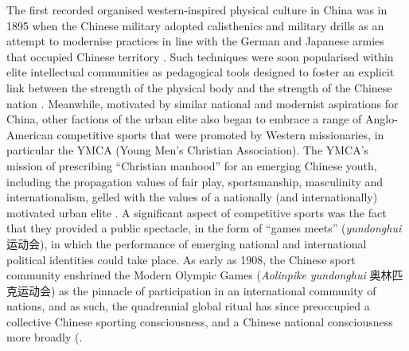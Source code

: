   The first recorded organised western-inspired physical culture in China was in 1895 when the Chinese military adopted calisthenics and military drills as an attempt to modernise practices in line with the German and Japanese armies that occupied Chinese territory \citep[viii]{Knuttgen1990}. Such techniques were soon popularised within elite intellectual communities as pedagogical tools designed to foster an explicit link between the strength of the physical body and the strength of the Chinese nation \cites[32]{Morris2004}[49]{Brownell1995}.  Meanwhile, motivated by similar national and modernist aspirations for China, other factions of the urban elite also began to embrace a range of Anglo-American competitive sports that were promoted by Western missionaries, in particular the YMCA (Young Men’s Christian Association).  The YMCA’s mission of prescribing ``Christian manhood'' for an emerging Chinese youth, including the propagation values of fair play, sportsmanship, masculinity and internationalism, gelled with the values of a nationally (and internationally) motivated urban elite \citep[240]{Morris2004}.  A significant aspect of competitive sports was the fact that they provided a public spectacle, in the form of “games meets” (\textit{yundonghui} 运动会), in which the performance of emerging national and international political identities could take place.  As early as 1908, the Chinese sport community enshrined the Modern Olympic Games (\textit{Aolinpike yundonghui} 奥林匹克运动会) as the pinnacle of participation in an international community of nations, and as such, the quadrennial global ritual has since preoccupied a collective Chinese sporting consciousness, and a Chinese national consciousness more broadly (\citep{Burnett2009;Barme2009;Brownell2008;Morris2004;Xu2008}.

